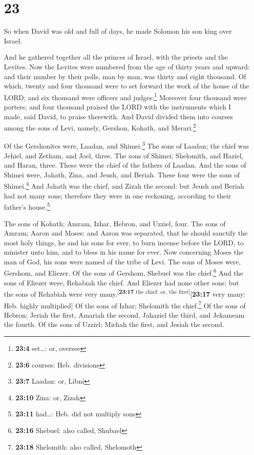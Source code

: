 \hypertarget{section-22}{%
\section{23}\label{section-22}}

 So when David was old and full of days, he made Solomon
his son king over Israel.

 And he gathered together all the princes of Israel, with
the priests and the Levites.  Now the Levites were
numbered from the age of thirty years and upward: and their number by
their polls, man by man, was thirty and eight thousand. 
Of which, twenty and four thousand were to set forward the work of the
house of the LORD; and six thousand were officers and judges:\footnote{\textbf{23:4}
  set\ldots: or, oversee}  Moreover four thousand were
porters; and four thousand praised the LORD with the instruments which I
made, said David, to praise therewith.  And David divided
them into courses among the sons of Levi, namely, Gershon, Kohath, and
Merari.\footnote{\textbf{23:6} courses: Heb. divisions}

 Of the Gershonites were, Laadan, and Shimei.\footnote{\textbf{23:7}
  Laadan: or, Libni}  The sons of Laadan; the chief was
Jehiel, and Zetham, and Joel, three.  The sons of Shimei;
Shelomith, and Haziel, and Haran, three. These were the chief of the
fathers of Laadan.  And the sons of Shimei were, Jahath,
Zina, and Jeush, and Beriah. These four were the sons of
Shimei.\footnote{\textbf{23:10} Zina: or, Zizah}  And
Jahath was the chief, and Zizah the second: but Jeush and Beriah had not
many sons; therefore they were in one reckoning, according to their
father's house.\footnote{\textbf{23:11} had\ldots: Heb. did not multiply
  sons}

 The sons of Kohath; Amram, Izhar, Hebron, and Uzziel,
four.  The sons of Amram; Aaron and Moses: and Aaron was
separated, that he should sanctify the most holy things, he and his sons
for ever, to burn incense before the LORD, to minister unto him, and to
bless in his name for ever.  Now concerning Moses the man
of God, his sons were named of the tribe of Levi.  The
sons of Moses were, Gershom, and Eliezer.  Of the sons of
Gershom, Shebuel was the chief.\footnote{\textbf{23:16} Shebuel: also
  called, Shubael}  And the sons of Eliezer were,
Rehabiah the chief. And Eliezer had none other sons; but the sons of
Rehabiah were very many.\textsuperscript{{[}\textbf{23:17} the chief:
or, the first{]}}{[}\textbf{23:17} very many: Heb. highly multiplied{]}
 Of the sons of Izhar; Shelomith the chief.\footnote{\textbf{23:18}
  Shelomith: also called, Shelomoth}  Of the sons of
Hebron; Jeriah the first, Amariah the second, Jahaziel the third, and
Jekameam the fourth.  Of the sons of Uzziel; Michah the
first, and Jesiah the second.

